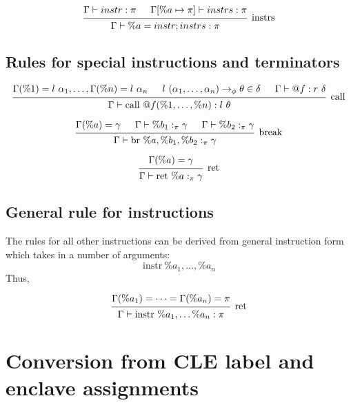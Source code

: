 \documentclass{article}
\begin{document}
\[
\begin{prooftree} 
    \hypo{\Gamma \vdash instr : \pi}
    \hypo{\Gamma[\%a \mapsto \pi] \vdash instrs : \pi}
    \infer2[instrs]{\Gamma \vdash \%a = instr; instrs : \pi}
\end{prooftree} 
\]

\subsection{Rules for special instructions and terminators}

\[
\begin{prooftree}
    \hypo{\Gamma(\%1) = l\ \alpha_1, \dots, \Gamma(\%n) = l\ \alpha_n}
    \hypo{l\ (\alpha_1, \dots, \alpha_n) \rightarrow_\phi \theta \in \delta}
    \hypo{\Gamma \vdash @f : r\ \delta}
    \infer3[call]{\Gamma \vdash \text{call } @f(\%1, \dots, \%n) : l\ \theta}
\end{prooftree}
\]

\[
\begin{prooftree}
    \hypo{\Gamma(\%a) = \gamma}
    \hypo{\Gamma \vdash \%b_1 :_\pi \gamma} 
    \hypo{\Gamma \vdash \%b_2 :_\pi \gamma} 
    \infer3[break]{\Gamma \vdash \text{br }\%a, \%b_1, \%b_2 :_\pi \gamma}
\end{prooftree}
\]

\[
\begin{prooftree}
    \hypo{\Gamma(\%a) = \gamma}
    \infer1[ret]{\Gamma \vdash \text{ret }\%a :_\pi \gamma}
\end{prooftree}
\]

\subsection{General rule for instructions}

The rules for all other instructions
can be derived from general instruction form which takes in
a number of arguments:
$$\text{instr}\ \%a_1, \dots, \%a_n$$
Thus,

\[
\begin{prooftree}
    \hypo{\Gamma(\%a_1) = \dots = \Gamma(\%a_n) = \pi}
    \infer1[ret]{\Gamma \vdash \text{instr}\ \%a_1, \dots \%a_n : \pi}
\end{prooftree}
\]

\section{Conversion from CLE label and enclave assignments}
\end{document}
